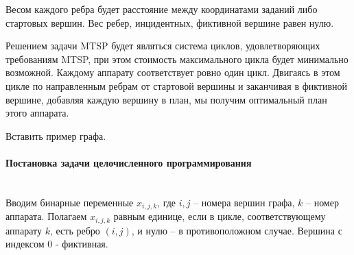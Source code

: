 \documentclass[a4paper,14pt,russian]{article}
\begin{document}
Весом каждого ребра будет расстояние между координатами заданий либо стартовых вершин. Вес ребер, инцидентных, фиктивной вершине равен нулю.

Решением задачи MTSP будет являться система циклов, удовлетворяющих требованиям MTSP, при этом стоимость максимального цикла будет минимально возможной. Каждому аппарату соответствует ровно один цикл. Двигаясь в этом цикле по направленным ребрам от стартовой вершины и заканчивая в фиктивной вершине, добавляя каждую вершину в план, мы получим оптимальный план этого аппарата.


Вставить пример графа.


\paragraph{Постановка задачи целочисленного программирования} ~\\

Вводим бинарные переменные $x_{i,j,k}$, где $i, j$ -- номера вершин графа, $k$ -- номер аппарата. Полагаем $x_{i,j,k}$ равным единице, если в цикле, соответствующему аппарату $k$, есть ребро $(i, j)$, и нулю -- в противоположном случае. Вершина с индексом $0$ - фиктивная.
\end{document}
